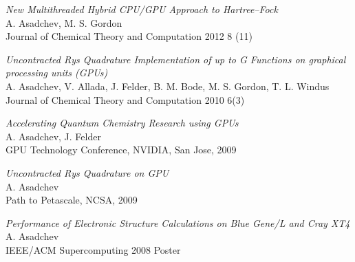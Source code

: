 \documentclass[overlap,line]{cv}
\begin{document}
\begin{resume}
{\it New Multithreaded Hybrid CPU/GPU Approach to Hartree–Fock} \\
A. Asadchev, M. S. Gordon \\
Journal of Chemical Theory and Computation 2012 8 (11)

{\it Uncontracted Rys Quadrature Implementation of up to G Functions on graphical processing units (GPUs)} \\
A. Asadchev, V. Allada, J. Felder, B. M. Bode, M. S. Gordon, T. L. Windus \\
Journal of Chemical Theory and Computation 2010 6(3)

{\it Accelerating Quantum Chemistry Research using GPUs} \\
A. Asadchev, J. Felder \\
GPU Technology Conference, NVIDIA, San Jose, 2009


{\it Uncontracted Rys Quadrature on GPU} \\
A. Asadchev \\
Path to Petascale, NCSA, 2009

{\it Performance of Electronic Structure Calculations on Blue Gene/L and Cray XT4} \\
A. Asadchev \\
IEEE/ACM Supercomputing 2008 Poster

\end{resume}
\end{document}
